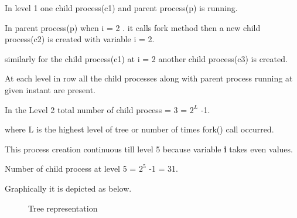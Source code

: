 \documentclass[journal,12pt,twocolumn]{IEEEtran}
\begin{document}
In level 1 one child process(c1) and parent process(p) is running.
 
In parent process(p) when i = 2 . it calls fork method then a new child process(c2) is created with variable i = 2.

similarly for the child process(c1) at i = 2 another child process(c3) is created.

At each level in row all the child processes along with parent process running at given instant are present.

In the Level 2 total number of child process = 3 = ${2^L}$ -1.

where L is the highest level of tree or number of times fork() call occurred.

This process creation continuous till level 5 because variable \textbf{i} takes even values.

Number of child process at level 5 = ${2^5}$ -1 = 31.


Graphically it is depicted as below.

\begin{figure}[!h]
\centering
{}
\caption{Tree representation} \label{fig:tree1}
\end{figure}
\end{document}
